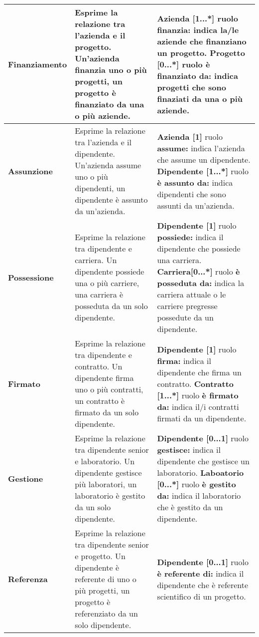 \begin{xltabular}{\textwidth}{l X X}
        \textbf{Finanziamento} & Esprime la relazione tra l'azienda e il progetto. Un'azienda finanzia uno o più progetti, un progetto è finanziato da una o più aziende. & \textbf{Azienda [1...*]} ruolo \textbf{finanzia:} indica la/le aziende che finanziano un progetto. 
        \newline\textbf{Progetto [0...*]} ruolo \textbf{è finanziato da:} indica progetti che sono finaziati da una o più aziende. \\
        \hline
        \textbf{Assunzione} & Esprime la relazione tra l'azienda e il dipendente. Un'azienda assume uno o più dipendenti, un dipendente è assunto da un'azienda. & \textbf{Azienda [1]} ruolo \textbf{assume:} indica l'azienda che assume un dipendente. 
        \newline\textbf{Dipendente [1...*]} ruolo \textbf{è assunto da:} indica dipendenti che sono assunti da un'azienda. \\
        \hline
        \textbf{Possessione} & Esprime la relazione tra dipendente e carriera. Un dipendente possiede una o più carriere, una carriera è posseduta da un solo dipendente. & \textbf{Dipendente [1]} ruolo \textbf{possiede:} indica il dipendente che possiede una carriera. 
        \newline\textbf{Carriera[0...*]} ruolo \textbf{è posseduta da:} indica la carriera attuale o le carriere pregresse possedute da un dipendente. \\
        \hline
        \textbf{Firmato} & Esprime la relazione tra dipendente e contratto. Un dipendente firma uno o più contratti, un contratto è firmato da un solo dipendente. & \textbf{Dipendente [1]} ruolo \textbf{firma:} indica il dipendente che firma un contratto. 
        \newline\textbf{Contratto [1...*]} ruolo \textbf{è firmato da:} indica il/i contratti firmati da un dipendente.\\
        \hline
        \textbf{Gestione} & Esprime la relazione tra dipendente senior e laboratorio. Un dipendente gestisce più laboratori, un laboratorio è gestito da un solo dipendente. & \textbf{Dipendente [0...1]} ruolo \textbf{gestisce:} indica il dipendente che gestisce un laboratorio. 
        \newline\textbf{Laboatorio [0...*]} ruolo \textbf{è gestito da:} indica il laboratorio che è gestito da un dipendente. \\
        \hline
        \textbf{Referenza} & Esprime la relazione tra dipendente senior e progetto. Un dipendente è referente di uno o più progetti, un progetto è referenziato da un solo dipendente. & \textbf{Dipendente [0...1]} ruolo \textbf{è referente di:} indica il dipendente che è referente scientifico di un progetto. 

\end{xltabular}
